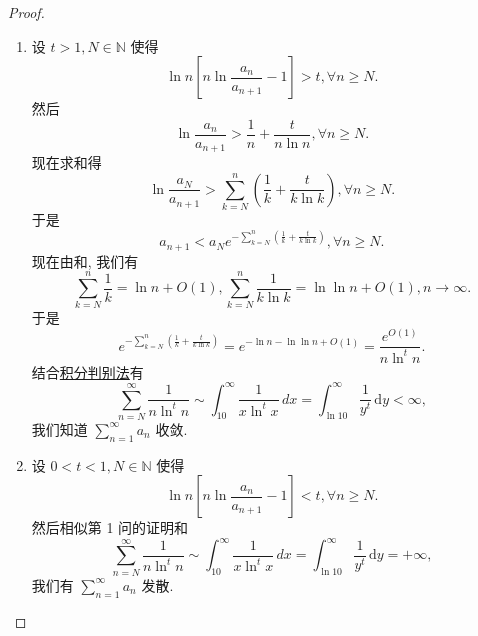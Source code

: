 \documentclass[../../main.tex]{subfiles}
\begin{document}
\begin{proof}
\begin{enumerate}
\item 设 \( t > 1, N \in \mathbb{N} \) 使得
\[
\ln n \left[ n \ln \frac{a_n}{a_{n + 1}} - 1 \right] > t, \forall n \geqslant N.
\]
然后
\[
\ln \frac{a_n}{a_{n + 1}} > \frac{1}{n} + \frac{t}{n \ln n}, \forall n \geqslant N.
\]
现在求和得
\[
\ln \frac{a_N}{a_{n + 1}} > \sum_{k=N}^n \left( \frac{1}{k} + \frac{t}{k \ln k} \right), \forall n \geqslant N.
\]
于是
\[
a_{n + 1} < a_N e^{-\sum\limits_{k=N}^n \left( \frac{1}{k} + \frac{t}{k \ln k} \right)}, \forall n \geqslant N.
\]
现在由和, 我们有
\[
\sum_{k=N}^n \frac{1}{k} = \ln n + O(1), \sum_{k=N}^n \frac{1}{k \ln k} = \ln \ln n + O(1), n \to \infty.
\]
于是
\[
e^{-\sum\limits_{k=N}^n \left( \frac{1}{k} + \frac{t}{k \ln k} \right)} = e^{-\ln n - \ln \ln n + O(1)} = \frac{e^{O(1)}}{n \ln^t n}.
\]
结合\hyperref[theorem:积分判别法]{积分判别法}有
\[
\sum_{n=N}^\infty \frac{1}{n \ln^t n} \sim \int_{10}^\infty \frac{1}{x \ln^t x} \, dx = \int_{\ln 10}^\infty \frac{1}{y^t} \, \mathrm{d}y < \infty,
\]
我们知道 \( \sum_{n=1}^\infty a_n \) 收敛.

\item 设 \( 0 < t < 1, N \in \mathbb{N} \) 使得
\[
\ln n \left[ n \ln \frac{a_n}{a_{n + 1}} - 1 \right] < t, \forall n \geqslant N.
\]
然后相似第 1 问的证明和
\[
\sum_{n=N}^\infty \frac{1}{n \ln^t n} \sim \int_{10}^\infty \frac{1}{x \ln^t x} \, dx = \int_{\ln 10}^\infty \frac{1}{y^t} \, \mathrm{d}y = +\infty,
\]
我们有 \( \sum_{n=1}^\infty a_n \) 发散.
\end{enumerate}
\end{proof}
\end{document}
